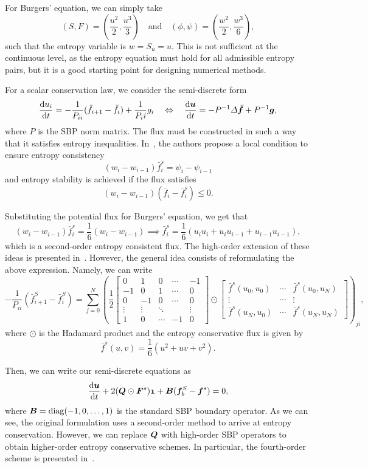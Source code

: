 \documentclass{scrartcl}
\begin{document}
For Burgers' equation, we can simply take
\[
(S, F) = \left(\frac{u^2}{2}, \frac{u^3}{3}\right)
\quad \text{and} \quad
(\phi, \psi) = \left(\frac{w^2}{2}, \frac{w^3}{6}\right),
\]
such that the entropy variable is $w = S_u = u$. This is not sufficient at the
continuous level, as the entropy equation must hold for all admissible entropy
pairs, but it is a good starting point for designing numerical methods.

For a scalar conservation law, we consider the semi-discrete form
\[
\od{u_i}{t} = -\frac{1}{P_{ii}} (\bar{f}_{i + 1} - \bar{f}_i) + \frac{1}{P_ii} g_i
\quad \Leftrightarrow \quad
\od{\vect{u}}{t} = -P^{-1} \Delta \bar{\vect{f}} + P^{-1} \vect{g},
\]
where $P$ is the SBP norm matrix. The flux must be constructed in such a way
that it satisfies entropy inequalities. In~\cite{Fisher2013}, the authors
propose a local condition to ensure entropy consistency
\[
(w_i - w_{i - 1}) \bar{f}^s_i = \psi_i - \psi_{i - 1}
\]
and entropy stability is achieved if the flux satisfies
\[
(w_i - w_{i - 1}) (\bar{f}_i - \bar{f}^s_i) \le 0.
\]

Substituting the potential flux for Burgers' equation, we get that
\[
(w_i - w_{i - 1}) \bar{f}^s_i = \frac{1}{6} (w_{i} - w_{i - 1})
\implies
\bar{f}^s_i =  \frac{1}{6} (u_i u_i + u_i u_{i - 1} + u_{i - 1} u_{i - 1}),
\]
which is a second-order entropy consistent flux. The high-order extension of
these ideas is presented in~. However, the general idea
consists of reformulating the above expression. Namely, we can write
\[
-\frac{1}{P_{ii}} (\bar{f}^S_{i + 1} - \bar{f}^S_i) =
\sum_{j = 0}^N \left(
\frac{1}{2}
\begin{bmatrix}
0 & 1 & 0 & \cdots & -1 \\
-1 & 0 & 1 & \cdots & 0 \\
0 & -1 & 0 & \cdots & 0 \\
\vdots & \vdots & \ddots & & \vdots \\
1 & 0 & \cdots & -1 & 0
\end{bmatrix}
\odot
\begin{bmatrix}
\bar{f}^s(u_0, u_0) & \cdots & \bar{f}^s(u_0, u_N) \\
\vdots & \cdots & \vdots \\
\bar{f}^s(u_N, u_0) & \cdots & \bar{f}^s(u_N, u_N)
\end{bmatrix}
\right)_{ji},
\]
where $\odot$ is the Hadamard product and the entropy conservative flux is given
by
\[
\bar{f}^s(u, v) = \frac{1}{6} (u^2 + uv + v^2).
\]

Then, we can write our semi-discrete equations as
\[
\od{\vect{u}}{t}
+ 2 (\vect{Q} \odot \vect{F}^s) \vect{1}
+ \vect{B} (\vect{f}^S_b - \vect{f}^s) = 0,
\]
where $\vect{B} = \operatorname{diag}(-1, 0, \dots, 1)$ is the standard SBP
boundary operator. As we can see, the original formulation uses a second-order
method to arrive at entropy conservation. However, we can replace $\vect{Q}$
with high-order SBP operators to obtain higher-order entropy conservative
schemes. In particular, the fourth-order scheme is presented in~.
\end{document}
